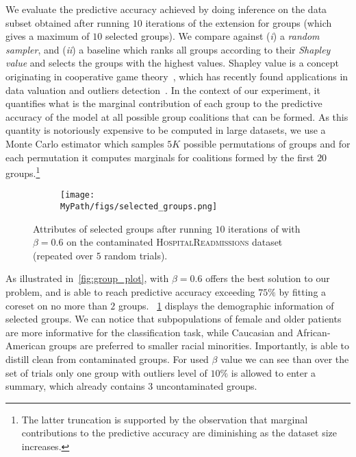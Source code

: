 We evaluate the predictive accuracy achieved by doing inference on the data subset obtained after running $10$ iterations of the \bcores{} extension for groups (which gives a maximum of $10$ selected groups). We compare against (\emph{i}) a \emph{random sampler}, and (\emph{ii}) a baseline which ranks all groups according to their \emph{Shapley value} and selects the groups with the highest values. Shapley value is a concept originating in cooperative game theory~\citep{shapley53}, which has recently found applications in data valuation and outliers detection~\cite{ghorbani19}. In the context of our experiment, it quantifies what is the marginal contribution of each group to the predictive accuracy of the model at all possible group coalitions that can be formed. As this quantity is notoriously expensive to be computed in large datasets, we use a Monte Carlo estimator which samples $5K$ possible permutations of groups and for each permutation it computes marginals for coalitions formed by the first $20$ groups.\footnote{The latter truncation is supported by the observation that marginal contributions to the predictive accuracy are diminishing as the dataset size increases.}

\begin{figure}[t!]
	\begin{subfigure}[b]{.8\textwidth} 
		\centering
		\texttt{[image: \\MyPath/figs/selected\_groups.png]}
	\end{subfigure}	
	\centering
	\caption{Attributes of selected groups after running $10$ iterations of \bcores{} with $\beta=0.6$ on the contaminated \textsc{HospitalReadmissions} dataset (repeated over $5$ random trials).}
	\label{fig:selected_groups}
\end{figure}

As illustrated in~\cref{fig:group_plot}, \bcores{} with $\beta=0.6$ offers the best solution to our problem, and is able to reach predictive accuracy exceeding $75\%$ by fitting a coreset on no more than $2$ groups. ~\cref{fig:selected_groups} displays the demographic information of selected groups. We can notice that subpopulations of female and older patients are more informative for the classification task, while Caucasian and African-American groups are preferred to smaller racial minorities. Importantly, \bcores{} is able to distill clean from contaminated groups. For used $\beta$ value we can see than over the set of trials only one group with outliers level of $10\%$ is allowed to enter a summary, which already contains $3$ uncontaminated groups.

